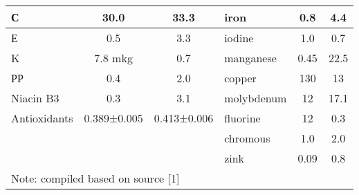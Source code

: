 \begin{table}[H]
{\begin{tabular}{|lcclcc|}
  \multicolumn{1}{|l|}{С}                 & \multicolumn{1}{c|}{30.0}                  & \multicolumn{1}{c|}{33.3}                        & \multicolumn{1}{l|}{iron}              & \multicolumn{1}{c|}{0.8}                   & 4.4                         \\ \hline
  \multicolumn{1}{|l|}{Е}                 & \multicolumn{1}{c|}{0.5}                   & \multicolumn{1}{c|}{3.3}                         & \multicolumn{1}{l|}{iodine}            & \multicolumn{1}{c|}{1.0}                   & 0.7                         \\ \hline
  \multicolumn{1}{|l|}{K}                 & \multicolumn{1}{c|}{7.8 mkg}               & \multicolumn{1}{c|}{0.7}                         & \multicolumn{1}{l|}{manganese}         & \multicolumn{1}{c|}{0.45}                  & 22.5                        \\ \hline
  \multicolumn{1}{|l|}{РР}                & \multicolumn{1}{c|}{0.4}                   & \multicolumn{1}{c|}{2.0}                         & \multicolumn{1}{l|}{copper}            & \multicolumn{1}{c|}{130}                   & 13                          \\ \hline
  \multicolumn{1}{|l|}{Niacin B3}         & \multicolumn{1}{c|}{0.3}                   & \multicolumn{1}{c|}{3.1}                         & \multicolumn{1}{l|}{molybdenum}        & \multicolumn{1}{c|}{12}                    & 17.1                        \\ \hline
  \multicolumn{1}{|l|}{Antioxidants}      & \multicolumn{1}{c|}{0.389±0.005}           & \multicolumn{1}{c|}{0.413±0.006}                 & \multicolumn{1}{l|}{fluorine}          & \multicolumn{1}{c|}{12}                    & 0.3                         \\ \hline
  \multicolumn{1}{|l|}{}                  & \multicolumn{1}{l|}{}                      & \multicolumn{1}{l|}{}                            & \multicolumn{1}{l|}{chromous}          & \multicolumn{1}{c|}{1.0}                   & 2.0                         \\ \hline
  \multicolumn{1}{|l|}{}                  & \multicolumn{1}{l|}{}                      & \multicolumn{1}{l|}{}                            & \multicolumn{1}{l|}{zink}              & \multicolumn{1}{c|}{0.09}                  & 0.8                         \\ \hline
  \multicolumn{6}{|l|}{Note: compiled based on source {[}1{]}}                                                                                                                                                                                                \\ \hline
  \end{tabular}
  }
  \end{table}

